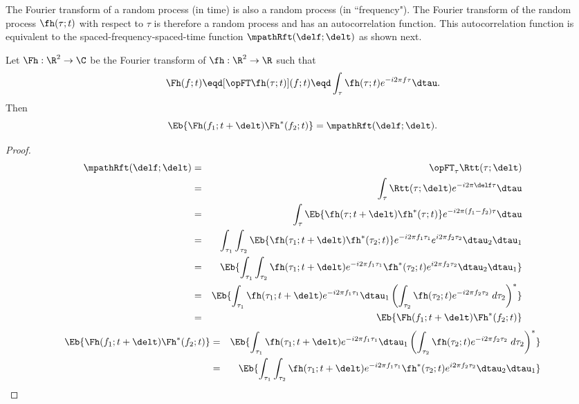 The Fourier transform of a random process (in time) is also 
a random process (in ``frequency").
The Fourier transform of the random process $\fh(\tau;t)$
with respect to $\tau$ is therefore a random process and has 
an autocorrelation function.
This autocorrelation function is equivalent to 
the spaced-frequency-spaced-time function $\mpathRft(\delf;\delt)$
as shown next.
\begin{proposition}
Let $\Fh:\R^2\to\C$ be the Fourier transform of $\fh:\R^2\to\R$ 
such that
  \[ \Fh(f;t) \eqd [\opFT \fh(\tau;t)](f;t) 
              \eqd \int_\tau \fh(\tau;t) e^{-i2\pi f\tau}\dtau.
  \]
Then
  \[ \Eb{\Fh(f_1;t+\delt)\Fh^\ast(f_2;t)} = \mpathRft(\delf;\delt). \]
\end{proposition}
\begin{proof}
\begin{eqnarray*}
   \mpathRft(\delf;\delt)
     &=& \opFT_\tau \Rtt(\tau;\delt)
   \\&=& \int_{\tau}\Rtt(\tau;\delt) e^{-i2\pi \delf \tau} \dtau
   \\&=& \int_{\tau}\Eb{\fh(\tau;t+\delt) \fh^\ast(\tau;t) }
              e^{-i2\pi (f_1-f_2)\tau}\dtau
   \\&=& \int_{\tau_1}\int_{\tau_2}\Eb{
             \fh(\tau_1;t+\delt) \fh^\ast(\tau_2;t) }
              e^{-i2\pi f_1\tau_1}e^{i2\pi f_2\tau_2} 
            \dtau_2 \dtau_1
   \\&=& \Eb{\int_{\tau_1}\int_{\tau_2}
             \fh     (\tau_1;t+\delt) e^{-i2\pi f_1\tau_1}
             \fh^\ast(\tau_2;t      ) e^{i2\pi f_2\tau_2} 
            \dtau_2 \dtau_1}
   \\&=& \Eb{      \int_{\tau_1}\fh(\tau_1;t+\delt) e^{-i2\pi f_1\tau_1} \dtau_1
             \left(\int_{\tau_2}\fh(\tau_2;t      ) e^{-i2\pi f_2\tau_2} \;d\tau_2\right)^\ast
            }
   \\&=& \Eb{\Fh(f_1;t+\delt)\Fh^\ast(f_2;t)}
\end{eqnarray*}
\fi
\begin{eqnarray*}
   \Eb{\Fh(f_1;t+\delt)\Fh^\ast(f_2;t)}
     &=& \Eb{      \int_{\tau_1}\fh(\tau_1;t+\delt) e^{-i2\pi f_1\tau_1} \dtau_1
             \left(\int_{\tau_2}\fh(\tau_2;t      ) e^{-i2\pi f_2\tau_2} \;d\tau_2\right)^\ast
            }
   \\&=& \Eb{\int_{\tau_1}\int_{\tau_2}
             \fh     (\tau_1;t+\delt) e^{-i2\pi f_1\tau_1}
             \fh^\ast(\tau_2;t      ) e^{i2\pi f_2\tau_2} 
            \dtau_2 \dtau_1}

\end{eqnarray*}
\end{proof}
